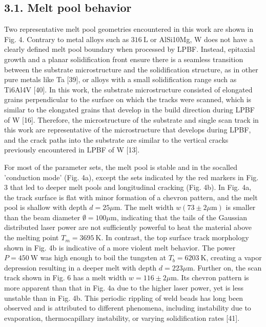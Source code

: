 \documentclass[10pt]{article}
\begin{document}
\subsection*{3.1. Melt pool behavior}
Two representative melt pool geometries encountered in this work are shown in Fig. 4. Contrary to metal alloys such as $316 \mathrm{~L}$ or AlSi10Mg, W does not have a clearly defined melt pool boundary when processed by LPBF. Instead, epitaxial growth and a planar solidification front ensure there is a seamless transition between the substrate microstructure and the solidification structure, as in other pure metals like Ta [39], or alloys with a small solidification range such as Ti6Al4V [40]. In this work, the substrate microstructure consisted of elongated grains perpendicular to the surface on which the tracks were scanned, which is similar to the elongated grains that develop in the build direction during LPBF of W [16]. Therefore, the microstructure of the substrate and single scan track in this work are representative of the microstructure that develops during LPBF, and the crack paths into the substrate are similar to the vertical cracks previously encountered in LPBF of W [13].

For most of the parameter sets, the melt pool is stable and in the socalled 'conduction mode' (Fig. 4a), except the sets indicated by the red markers in Fig. 3 that led to deeper melt pools and longitudinal cracking (Fig. 4b). In Fig. 4a, the track surface is flat with minor formation of a chevron pattern, and the melt pool is shallow with depth $d=25 \mu \mathrm{m}$. The melt width $w(73 \pm 2 \mu \mathrm{m})$ is smaller than the beam diameter $\emptyset=100 \mu \mathrm{m}$, indicating that the tails of the Gaussian distributed laser power are not sufficiently powerful to heat the material above the melting point $T_{m}=3695 \mathrm{~K}$. In contrast, the top surface track morphology shown in Fig. 4b is indicative of a more violent melt behavior. The power $P=450 \mathrm{~W}$ was high enough to boil the tungsten at $T_{b}=6203 \mathrm{~K}$, creating a vapor depression resulting in a deeper melt with depth $d=223 \mu \mathrm{m}$. Further on, the scan track shown in Fig. 6 has a melt width $w=116 \pm 2 \mu \mathrm{m}$. Its chevron pattern is more apparent than that in Fig. 4a due to the higher laser power, yet is less unstable than in Fig. 4b. This periodic rippling of weld beads has long been observed and is attributed to different phenomena, including instability due to evaporation, thermocapillary instability, or varying solidification rates [41].
\end{document}
